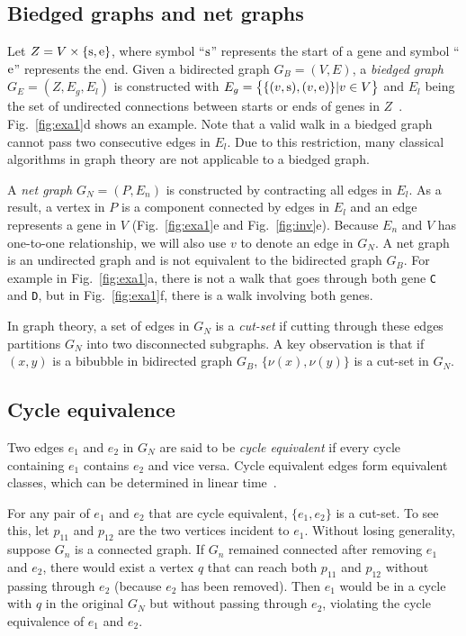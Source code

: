\documentclass[webpdf,contemporary,large,namedate]{oup-authoring-template}%
\begin{document}
\subsection{Biedged graphs and net graphs}

Let $Z=V\times\{{\rm s},{\rm e}\}$, where symbol ``${\rm s}$'' represents the start of a gene
and symbol ``${\rm e}$'' represents the end.
Given a bidirected graph $G_B=(V,E)$, a \emph{biedged graph} $G_E=(Z,E_g,E_l)$ is constructed
with $E_g=\big\{\{(v,{\rm s}),(v,{\rm e})\}|v\in V\big\}$ and $E_l$ being the set of undirected connections between starts or ends of genes in $Z$~\citep{Paten:2018aa}.
Fig.~\ref{fig:exa1}d shows an example.
Note that a valid walk in a biedged graph cannot pass two consecutive edges in $E_l$.
Due to this restriction, many classical algorithms in graph theory are not applicable to a biedged graph.

A \emph{net graph} $G_N=(P,E_n)$ is constructed by contracting all edges in $E_l$.
As a result, a vertex in $P$ is a component connected by edges in $E_l$
and an edge represents a gene in $V$ (Fig.~\ref{fig:exa1}e and Fig.~\ref{fig:inv}e).
Because $E_n$ and $V$ has one-to-one relationship, we will also use $v$ to denote an edge in $G_N$.
A net graph is an undirected graph and is not equivalent to the bidirected graph $G_B$.
For example in Fig.~\ref{fig:exa1}a, there is not a walk that goes through both gene {\tt C} and {\tt D},
but in Fig.~\ref{fig:exa1}f, there is a walk involving both genes.

In graph theory, a set of edges in $G_N$ is a \emph{cut-set} if cutting through these edges
partitions $G_N$ into two disconnected subgraphs.
A key observation is that if $(x,y)$ is a bibubble in bidirected graph $G_B$,
$\{\nu(x),\nu(y)\}$ is a cut-set in $G_N$.

\subsection{Cycle equivalence}

Two edges $e_1$ and $e_2$ in $G_N$ are said to be \emph{cycle equivalent}
if every cycle containing $e_1$ contains $e_2$ and vice versa.
Cycle equivalent edges form equivalent classes, which can be determined in linear time~\citep{DBLP:conf/pldi/JohnsonPP94}.

For any pair of $e_1$ and $e_2$ that are cycle equivalent, $\{e_1,e_2\}$ is a cut-set.
To see this, let $p_{11}$ and $p_{12}$ are the two vertices incident to $e_1$.
Without losing generality, suppose $G_n$ is a connected graph.
If $G_n$ remained connected after removing $e_1$ and $e_2$,
there would exist a vertex $q$ that can reach both $p_{11}$ and $p_{12}$ without passing through $e_2$ (because $e_2$ has been removed).
Then $e_1$ would be in a cycle with $q$ in the original $G_N$ but without passing through $e_2$,
violating the cycle equivalence of $e_1$ and $e_2$.
\end{document}
